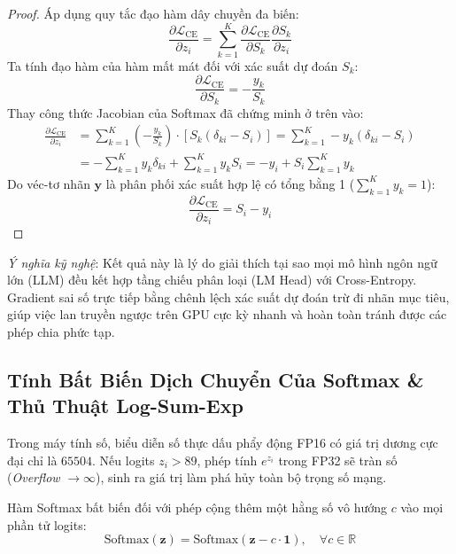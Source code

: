 \begin{proof}
Áp dụng quy tắc đạo hàm dây chuyền đa biến:
\begin{equation*}
\frac{\partial \mathcal{L}_{\text{CE}}}{\partial z_i} = \sum_{k=1}^K \frac{\partial \mathcal{L}_{\text{CE}}}{\partial S_k} \frac{\partial S_k}{\partial z_i}
\end{equation*}
Ta tính đạo hàm của hàm mất mát đối với xác suất dự đoán $S_k$:
\begin{equation*}
\frac{\partial \mathcal{L}_{\text{CE}}}{\partial S_k} = - \frac{y_k}{S_k}
\end{equation*}
Thay công thức Jacobian của Softmax đã chứng minh ở trên vào:
\begin{align*}
\frac{\partial \mathcal{L}_{\text{CE}}}{\partial z_i} &= \sum_{k=1}^K \left( - \frac{y_k}{S_k} \right) \cdot \left[ S_k (\delta_{ki} - S_i) \right] = \sum_{k=1}^K - y_k (\delta_{ki} - S_i) \\
&= - \sum_{k=1}^K y_k \delta_{ki} + \sum_{k=1}^K y_k S_i = - y_i + S_i \sum_{k=1}^K y_k
\end{align*}
Do véc-tơ nhãn $\mathbf{y}$ là phân phối xác suất hợp lệ có tổng bằng 1 ($\sum_{k=1}^K y_k = 1$):
\begin{equation*}
\frac{\partial \mathcal{L}_{\text{CE}}}{\partial z_i} = S_i - y_i
\end{equation*}
\end{proof}

\textit{Ý nghĩa kỹ nghệ}: Kết quả này là lý do giải thích tại sao mọi mô hình ngôn ngữ lớn (LLM) đều kết hợp tầng chiếu phân loại (LM Head) với Cross-Entropy. Gradient sai số trực tiếp bằng chênh lệch xác suất dự đoán trừ đi nhãn mục tiêu, giúp việc lan truyền ngược trên GPU cực kỳ nhanh và hoàn toàn tránh được các phép chia phức tạp.

\subsection{Tính Bất Biến Dịch Chuyển Của Softmax \& Thủ Thuật Log-Sum-Exp}

Trong máy tính số, biểu diễn số thực dấu phẩy động FP16 có giá trị dương cực đại chỉ là $65504$. Nếu logits $z_i > 89$, phép tính $e^{z_i}$ trong FP32 sẽ tràn số (\textit{Overflow} $\to \infty$), sinh ra giá trị  làm phá hủy toàn bộ trọng số mạng.

\begin{proposition}
Hàm Softmax bất biến đối với phép cộng thêm một hằng số vô hướng $c$ vào mọi phần tử logits:
\begin{equation}
\text{Softmax}(\mathbf{z}) = \text{Softmax}(\mathbf{z} - c \cdot \mathbf{1}), \quad \forall c \in \mathbb{R}
\end{equation}
\end{proposition}


